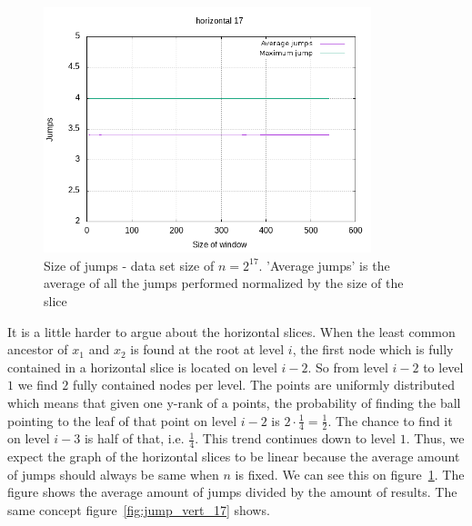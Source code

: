 \begin{figure}[h]
    \centering
    \includegraphics[width = 0.85\textwidth]{pictures/analysis/jump_hori_17.png}
    \caption{Size of jumps - data set size of $n=2^{17}$. 'Average jumps' is the average of all the jumps performed normalized by the size of the slice}\label{fig:jump_hori_17}
\end{figure}
\clearpage

It is a little harder to argue about the horizontal slices. When the least common ancestor of $x_1$ and $x_2$ is found at the root at level $i$, the first node which is fully contained in a horizontal slice is located on level $i-2$. So from level $i-2$ to level $1$ we find $2$ fully contained nodes per level. The points are uniformly distributed which means that given one y-rank of a points, the probability of finding the ball pointing to the leaf of that point on level $i-2$ is $2\cdot\frac{1}{4} = \frac{1}{2}$. The chance to find it on level $i-3$ is half of that, i.e. $\frac{1}{4}$. This trend continues down to level $1$. Thus, we expect the graph of the horizontal slices to be linear because the average amount of jumps should always be same when $n$ is fixed. We can see this on figure~\ref{fig:jump_hori_17}. The figure shows the average amount of jumps divided by the amount of results. The same concept figure~\ref{fig:jump_vert_17} shows. 

